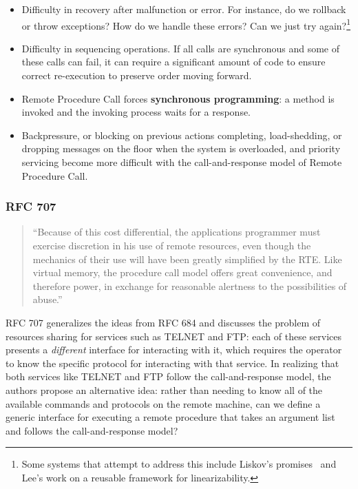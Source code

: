 \begin{itemize}
	\item Difficulty in recovery after malfunction or error.  For instance, do we rollback or throw exceptions?  How do we handle these errors?  Can we just try again?\footnote{Some systems that attempt to address this include Liskov's promises~\cite{liskov1988promises} and Lee's \cite{lee2015implementing} work on a reusable framework for linearizability.}
	\item Difficulty in sequencing operations.  If all calls are synchronous and some of these calls can fail, it can require a significant amount of code to ensure correct re-execution to preserve order moving forward. 
	\item Remote Procedure Call forces \textbf{synchronous programming}: a method is invoked and the invoking process waits for a response.
	\item Backpressure, or blocking on previous actions completing, load-shedding, or dropping messages on the floor when the system is overloaded, and priority servicing become more difficult with the call-and-response model of Remote Procedure Call.
\end{itemize}

\subsubsection{RFC 707}

\begin{quote}
``Because of this cost differential, the applications programmer must exercise discretion in his use of remote resources, even though the mechanics of their use will have been greatly simplified by the RTE. Like virtual memory, the procedure call model offers great convenience, and therefore power, in exchange for reasonable alertness to the possibilities of abuse.''
\end{quote}

RFC 707 generalizes the ideas from RFC 684 and discusses the problem of resources sharing for services such as TELNET and FTP: each of these services presents a \textit{different} interface for interacting with it, which requires the operator to know the specific protocol for interacting with that service.  In realizing that both services like TELNET and FTP follow the call-and-response model, the authors propose an alternative idea: rather than needing to know all of the available commands and protocols on the remote machine, can we define a generic interface for executing a remote procedure that takes an argument list and follows the call-and-response model?

